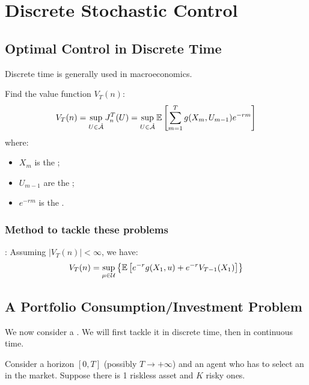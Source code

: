 \section{Discrete Stochastic Control}

\subsection{Optimal Control in Discrete Time}

Discrete time is generally used in macroeconomics.

\begin{problem*}
Find the value function $V_T(n)$:
\begin{equation}
    V_T(n) = \sup_{U \in \hat{\mathcal{A}}} J_n^T(U) = \sup_{U \in \hat{\mathcal{A}}} \mathbb E \left[ \sum_{m=1}^T g(X_m, U_{m-1}) e^{-rm} \right]
\end{equation}
where:
\begin{itemize}
    \item $X_m$ is the ;
    \item $U_{m-1}$ are the ;
    \item $e^{-rm}$ is the .
\end{itemize}
\end{problem*}

\subsubsection{Method to tackle these problems}

:
Assuming $|V_T(n)| < \infty$, we have:
\begin{equation}
    V_T(n) = \sup_{\mu \in \mathcal{U}} \left\{ \mathbb E \left[ e^{-r} g(X_1, u) + e^{-r} V_{T-1}(X_1) \right] \right\}
\end{equation}

\subsection{A Portfolio Consumption/Investment Problem}

We now consider a . We will first tackle it in discrete time, then in continuous time.

Consider a horizon $[0, T]$ (possibly $T \to +\infty$) and an agent who has to select an  in the market. Suppose there is 1 riskless asset and $K$ risky ones.

